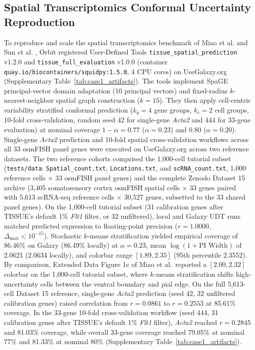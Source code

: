 \documentclass[11pt,letterpaper]{article}
\begin{document}
\subsection*{Spatial Transcriptomics Conformal Uncertainty Reproduction}
To reproduce and scale the spatial transcriptomics benchmark of Miao et al. \cite{miao2026} and Sun et al. \cite{sun2024}, Orbit registered User-Defined Tools \texttt{tissue\_spatial\_prediction} v1.2.0 and \texttt{tissue\_full\_evaluation} v1.0.0 (container \texttt{quay.io/biocontainers/squidpy:1.5.0}, 4 CPU cores) on UseGalaxy.org (Supplementary Table~\ref{tab:case1_artifacts}). The tools implement SpaGE principal-vector domain adaptation (10 principal vectors) and fixed-radius $k$-nearest-neighbor spatial graph construction ($k = 15$). They then apply cell-centric variability stratified conformal prediction ($k_g = 4$ gene groups, $k_c = 2$ cell groups, 10-fold cross-validation, random seed 42 for single-gene \textit{Acta2} and 444 for 33-gene evaluation) at nominal coverage $1 - \alpha = 0.77$ ($\alpha = 0.23$) and $0.80$ ($\alpha = 0.20$). Single-gene \textit{Acta2} prediction and 10-fold spatial cross-validation workflows across all 33 osmFISH panel genes were executed on UseGalaxy.org across two reference datasets. The two reference cohorts comprised the 1,000-cell tutorial subset (\texttt{tests/data}: \texttt{Spatial\_count.txt}, \texttt{Locations.txt}, and \texttt{scRNA\_count.txt}, 1,000 reference cells $\times$ 33 osmFISH panel genes) and the complete Zenodo Dataset 15 archive (3,405 somatosensory cortex osmFISH spatial cells $\times$ 33 genes paired with 5,613 scRNA-seq reference cells $\times$ 30,527 genes, subsetted to the 33 shared panel genes). On the 1,000-cell tutorial subset (31 calibration genes after TISSUE's default 1\% \textit{Flt1} filter, or 32 unfiltered), local and Galaxy UDT runs matched predicted expression to floating-point precision ($r = 1.0000$, $\Delta_{\max} < 10^{-15}$). Stochastic $k$-means stratification yielded empirical coverage of 86.46\% on Galaxy (86.49\% locally) at $\alpha = 0.23$, mean $\log(1 + \text{PI Width})$ of 2.0621 (2.0634 locally), and colorbar range $[1.89, 2.35]$ (95th percentile 2.3552). By comparison, Extended Data Figure 1c of Miao et al.\ reported a $[2.00, 2.32]$ colorbar on the 1,000-cell tutorial subset, where $k$-means stratification shifts high-uncertainty cells between the ventral boundary and pial edge. On the full 5,613-cell Dataset 15 reference, single-gene \textit{Acta2} prediction (seed 42, 32 unfiltered calibration genes) raised correlation from $r = 0.0861$ to $r = 0.2553$ at 85.61\% coverage. In the 33-gene 10-fold cross-validation workflow (seed 444, 31 calibration genes after TISSUE's default 1\% \textit{Flt1} filter), \textit{Acta2} reached $r = 0.2845$ and 81.03\% coverage, while overall 33-gene coverage reached 79.05\% at nominal 77\% and 81.33\% at nominal 80\% (Supplementary Table~\ref{tab:case1_artifacts}).
\end{document}
